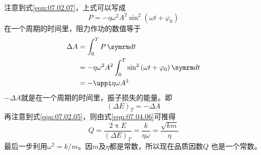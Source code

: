 注意到式\eqref{eqn:07.02.07}，上式可以写成
\begin{equation*}
  P = - \eta \omega ^ { 2 } A ^ { 2 } \sin ^ { 2 } \left( \omega t + \varphi _ { 0 } \right)
\end{equation*}
在一个周期的时间里，阻力作功的数值等于
\begin{equation}\label{eqn:07.04.06}
  \begin{aligned}
    \Delta A & = \int _ { 0 } ^ { T } P \dif t                                                                                      \\
             & = - \eta \omega ^ { 2 } A ^ { 2 } \int _ { 0 } ^ { T } \sin ^ { 2 } \left( \omega t + \varphi _ { 0 } \right) \dif t \\
             & = - \uppi \eta \omega A ^ { 2 }
  \end{aligned}
\end{equation}
$ - \Delta A $就是在一个周期的时间里，振子损失的能量。即
\begin{equation*}
  \left( \Delta E \right) _ { T } = - \Delta A
\end{equation*}
再注意到式\eqref{eqn:07.02.05}，则由式\eqref{eqn:07.04.06}可推得
\begin{equation}\label{eqn:07.04.07}
  Q = \frac { 2 \uppi E } { \left( \Delta E \right) _ { T } } = \frac { k } { \eta \omega } = \frac { \sqrt { k m } } { \eta }
\end{equation}
最后一步利用$ \omega ^ { 2 } = k / m $。因$ m $及$ \eta $都是常数，所以现在品质因数$ Q $
也是一个常数。

